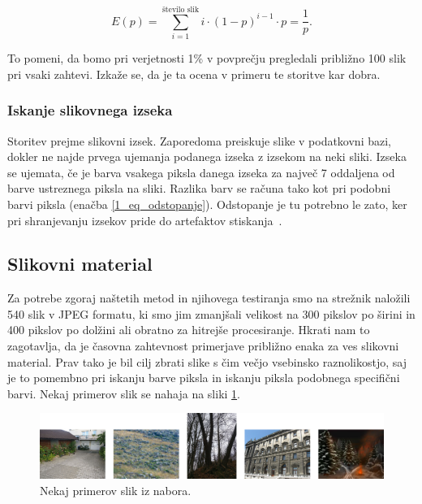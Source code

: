 \begin{equation} \label{1_eq_upanje}
E(p) = \sum_{i = 1}^{\text{število slik}} i \cdot (1 - p)^{i - 1} \cdot p = \frac{1}{p} .
\end{equation}

To pomeni, da bomo pri verjetnosti 1\% v povprečju pregledali približno 100 slik pri vsaki zahtevi.
Izkaže se, da je ta ocena v primeru te storitve kar dobra.

\subsubsection{Iskanje slikovnega izseka}

Storitev prejme slikovni izsek.
Zaporedoma preiskuje slike v podatkovni bazi, dokler ne najde prvega ujemanja podanega izseka z izsekom na neki sliki.
Izseka se ujemata, če je barva vsakega piksla danega izseka za največ 7 oddaljena od barve ustreznega piksla na sliki.
Razlika barv se računa tako kot pri podobni barvi piksla (enačba \ref{1_eq_odstopanje}).
Odstopanje je tu potrebno le zato, ker pri shranjevanju izsekov pride do artefaktov stiskanja~\cite{1_wiki_compression}.

\subsection{Slikovni material}

Za potrebe zgoraj naštetih metod in njihovega testiranja smo na strežnik naložili 540 slik v JPEG formatu, ki smo jim zmanjšali velikost na 300 pikslov po širini in 400 pikslov po dolžini ali obratno za hitrejše procesiranje.
Hkrati nam to zagotavlja, da je časovna zahtevnost primerjave približno enaka za ves slikovni material.
Prav tako je bil cilj zbrati slike s čim večjo vsebinsko raznolikostjo, saj je to pomembno pri iskanju barve piksla in iskanju piksla podobnega specifični barvi.
Nekaj primerov slik se nahaja na sliki \ref{fig:1_sample_images}.

\begin{figure}[H]
    \centering
    \includegraphics[scale=0.16]{Img/1_sample_images.png}
    \caption{Nekaj primerov slik iz nabora.}
    \label{fig:1_sample_images}
\end{figure}

